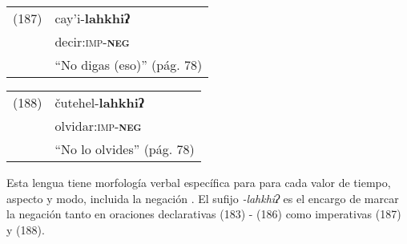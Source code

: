 {%
\begin{tabular}{ll}
(187) & cay'i-\textbf{lahkhiʔ} \\
& decir:\textsc{imp-\textbf{neg}} \\
& ``No digas (eso)'' (pág. 78)
\end{tabular} \vspace{0.5cm}

\begin{tabular}{ll}
(188) & čutehel-\textbf{lahkhiʔ} \\
& olvidar:\textsc{imp-\textbf{neg}}\\
& ``No lo olvides'' (pág. 78)
\end{tabular} \vspace{0.5cm}

}

Esta lengua tiene morfología verbal específica para para cada valor de tiempo, aspecto y modo, incluida la negación \textcolor{MidnightBlue}{\citep{wappo}}. El sufijo {\setmainfont{Charis SIL} \textit{-lahkhiʔ}} es el encargo de marcar la negación tanto en oraciones declarativas (183) - (186) como imperativas (187) y (188).